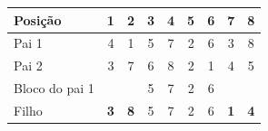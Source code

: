 \begin{tabular}{lcccccccc}
\toprule
Posição & 1 & 2 & 3 & 4 & 5 & 6 & 7 & 8 \\
\midrule
Pai 1 & 4 & 1 & 5 & 7 & 2 & 6 & 3 & 8 \\
Pai 2 & 3 & 7 & 6 & 8 & 2 & 1 & 4 & 5 \\
\midrule
Bloco do pai 1 &  &  & 5 & 7 & 2 & 6 &  &  \\
Filho & \textbf{3} & \textbf{8} & 5 & 7 & 2 & 6 & \textbf{1} & \textbf{4} \\
\bottomrule
\end{tabular}
